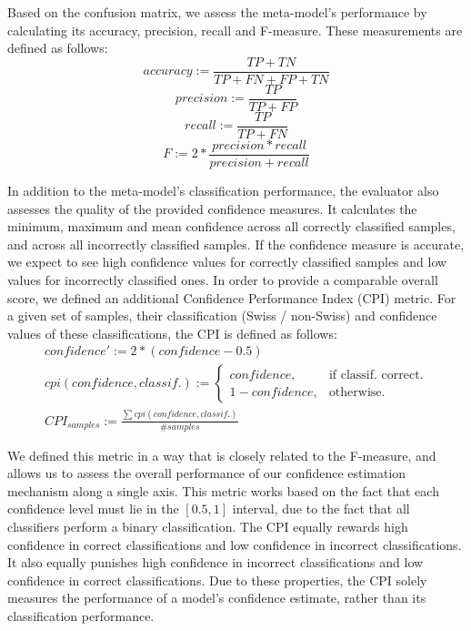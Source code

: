 \documentclass[10pt,a4paper]{article}
\begin{document}
Based on the confusion matrix, we assess the meta-model's performance by calculating its accuracy, precision, recall and F-measure. These measurements are defined as follows:
\begin{equation}
accuracy := \frac{TP+TN}{TP+FN+FP+TN}
\end{equation}
\begin{equation}
precision := \frac{TP}{TP+FP}
\end{equation}
\begin{equation}
recall := \frac{TP}{TP+FN}
\end{equation}
\begin{equation}
F := 2*\frac{precision * recall}{precision + recall}
\end{equation}

In addition to the meta-model's classification performance, the evaluator also assesses the quality of the provided confidence measures. It calculates the minimum, maximum and mean confidence across all correctly classified samples, and across all incorrectly classified samples. If the confidence measure is accurate, we expect to see high confidence values for correctly classified samples and low values for incorrectly classified ones. In order to provide a comparable overall score, we defined an additional Confidence Performance Index (CPI) metric. For a given set of samples, their classification (Swiss / non-Swiss) and confidence values of these classifications, the CPI is defined as follows:
\begin{equation}
\begin{split}
confidence' := 2*(confidence-0.5) \\
cpi(confidence, classif.) := \begin{cases}
    confidence, & \text{if classif. correct}.\\
    1-confidence, & \text{otherwise}.
  \end{cases} \\
CPI_{samples} := \frac{\sum cpi(confidence, classif.)}{\#samples}
\end{split}
\end{equation}

We defined this metric in a way that is closely related to the F-measure, and allows us to assess the overall performance of our confidence estimation mechanism along a single axis. This metric works based on the fact that each confidence level must lie in the $[0.5, 1]$ interval, due to the fact that all classifiers perform a binary classification. The CPI equally rewards high confidence in correct classifications and low confidence in incorrect classifications. It also equally punishes high confidence in incorrect classifications and low confidence in correct classifications. Due to these properties, the CPI solely measures the performance of a model's confidence estimate, rather than its classification performance.
\end{document}
